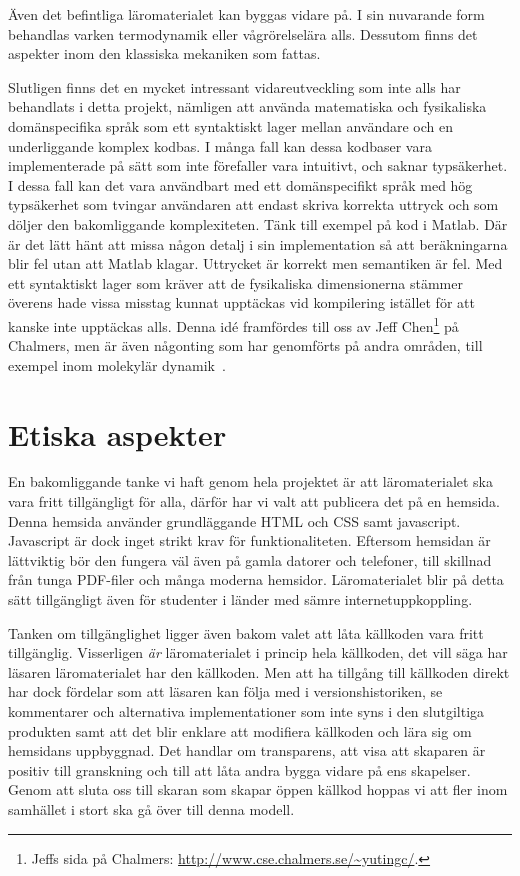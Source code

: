 Även det befintliga läromaterialet kan byggas vidare på. I sin nuvarande
form behandlas varken termodynamik eller vågrörelselära alls. Dessutom
finns det aspekter inom den klassiska mekaniken som fattas.

Slutligen finns det en mycket intressant vidareutveckling som inte alls har
behandlats i detta projekt, nämligen att använda matematiska och fysikaliska domänspecifika språk som
ett syntaktiskt lager mellan användare och en underliggande komplex kodbas. I
många fall kan dessa kodbaser vara implementerade på sätt som inte förefaller vara intuitivt, och saknar
typsäkerhet. I dessa fall kan det vara användbart med ett
domänspecifikt språk med hög typsäkerhet som tvingar användaren att
endast skriva korrekta uttryck och som döljer den bakomliggande komplexiteten. Tänk till exempel på kod i Matlab. Där är det lätt hänt att missa någon detalj i sin implementation så att beräkningarna blir fel utan att Matlab klagar. Uttrycket är korrekt men semantiken är fel. Med ett syntaktiskt lager som kräver att de fysikaliska dimensionerna stämmer överens hade vissa misstag kunnat upptäckas vid kompilering istället för att kanske inte upptäckas alls. Denna idé framfördes till oss av Jeff Chen\footnote{Jeffs sida på Chalmers:
\url{http://www.cse.chalmers.se/\~yutingc/}.}
på Chalmers, men är även någonting som har genomförts på andra områden, till
exempel inom molekylär dynamik~\cite{MD}.

\section{Etiska aspekter}

En bakomliggande tanke vi haft genom hela projektet är att läromaterialet ska
vara fritt tillgängligt för alla, därför har vi valt att publicera det på en
hemsida.  Denna hemsida använder grundläggande HTML och CSS samt javascript.
Javascript är dock inget strikt krav för funktionaliteten. Eftersom hemsidan är
lättviktig bör den fungera väl även på gamla datorer och telefoner, till
skillnad från tunga PDF-filer och många moderna hemsidor. Läromaterialet blir på
detta sätt tillgängligt även för studenter i länder med sämre
internetuppkoppling.

Tanken om tillgänglighet ligger även bakom valet att låta källkoden vara fritt
tillgänglig. Visserligen \textit{är} läromaterialet i princip hela källkoden, det vill säga
har läsaren läromaterialet har den källkoden. Men att ha tillgång till källkoden
direkt har dock fördelar som att läsaren kan följa med i versionshistoriken,
se kommentarer och alternativa implementationer som inte syns i den slutgiltiga
produkten samt att det blir enklare att modifiera källkoden och lära sig om
hemsidans uppbyggnad. Det handlar om transparens, att visa att skaparen är positiv till granskning
och till att låta andra bygga vidare på ens skapelser. Genom att
sluta oss till skaran som skapar öppen källkod hoppas vi att fler inom samhället
i stort ska gå över till denna modell.

